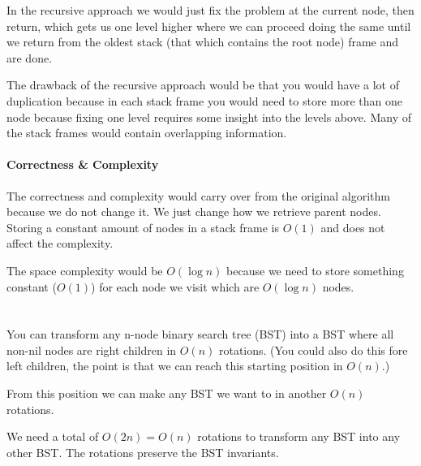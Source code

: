 \documentclass[12pt, a4paper]{article}
\begin{document}
In the recursive approach we would just fix the problem at the current node, then return, which gets us one level higher where we can proceed doing the same until we return from the oldest stack (that which contains the root node) frame and are done.

The drawback of the recursive approach would be that you would have a lot of duplication because in each stack frame you would need to store more than one node because fixing one level requires some insight into the levels above. Many of the stack frames would contain overlapping information.

\paragraph{Correctness \& Complexity}
The correctness and complexity would carry over from the original algorithm because we do not change it. We just change how we retrieve parent nodes. Storing a constant amount of nodes in a stack frame is $O(1)$ and does not affect the complexity.

The space complexity would be $O(\log n)$ because we need to store something constant ($O(1)$) for each node we visit which are $O(\log n)$ nodes.

\section{} %

You can transform any n-node binary search tree (BST) into a BST where all non-nil nodes are right children in $O(n)$ rotations. (You could also do this fore left children, the point is that we can reach this starting position in $O(n)$.)

From this position we can make any BST we want to in another $O(n)$ rotations.

We need a total of $O(2n) = O(n)$ rotations to transform any BST into any other BST. The rotations preserve the BST invariants.
\end{document}

